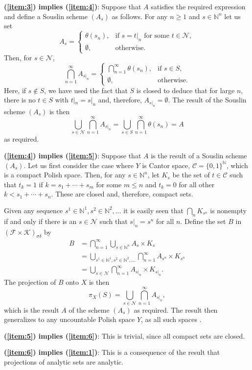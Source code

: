 \documentclass[12pt]{article}
\begin{document}
\noindent\textbf{(\ref{item:3}) implies (\ref{item:4})}:
Suppose that $A$ satisfies the required expression and define a Souslin scheme $(A_s)$ as follows. For any $n\ge 1$ and $s\in\mathbb{N}^n$ let us set
\begin{equation*}
A_s=\begin{cases}
\theta(s_n),&\textrm{if $s=t|_n$ for some $t\in \mathcal{N}$},\\
\emptyset,&\textrm{otherwise}.
\end{cases}
\end{equation*}
Then, for $s\in\mathcal{N}$,
\begin{equation*}
\bigcap_{n=1}^\infty A_{s|_n}=\begin{cases}
\bigcap_{n=1}^\infty\theta(s_n),&\textrm{if $s\in S$},\\
\emptyset,&\textrm{otherwise}.
\end{cases}
\end{equation*}
Here, if $s\not\in S$, we have used the fact that $S$ is closed to deduce that for large $n$, there is no $t\in S$ with $t|_n=s|_n$ and, therefore, $A_{s|_n}=\emptyset$.
The result of the Souslin scheme $(A_s)$ is then
\begin{equation*}
\bigcup_{s\in\mathcal{N}}\bigcap_{n=1}^\infty A_{s|_n}=\bigcup_{s\in S}\bigcap_{n=1}^\infty\theta(s_n) = A
\end{equation*}
as required.

\noindent\textbf{(\ref{item:4}) implies (\ref{item:5})}:
Suppose that $A$ is the result of a Souslin scheme $(A_s)$. Let us first consider the case where $Y$ is Cantor space, $\mathcal{C}=\{0,1\}^\mathbb{N}$, which is a compact Polish space.
Then, for any $s\in\mathbb{N}^n$, let $K_s$ be the set of $t\in\mathcal{C}$ such that $t_k=1$ if $k=s_1+\cdots+s_m$ for some $m\le n$ and $t_k=0$ for all other $k< s_1+\cdots+s_n$.
These are closed and, therefore, compact sets.

Given any sequence $s^1\in\mathbb{N}^1,s^2\in\mathbb{N}^2,\ldots$ it is easily seen that $\bigcap_nK_{s^n}$ is nonempty if and only if there is an $s\in\mathcal{N}$ such that $s|_n=s^n$ for all $n$.
Define the set $B$ in $(\mathcal{F}\times\mathcal{K})_{\sigma\delta}$ by
\begin{equation*}\begin{split}
B&=\bigcap_{n=1}^\infty\bigcup_{s\in\mathbb{N}^n}A_s\times K_s\\
&=\bigcup_{s^1\in\mathbb{N}^1,s^2\in\mathbb{N}^2,\ldots}\bigcap_{n=1}^\infty A_{s^n}\times K_{s^n}\\
&=\bigcup_{s\in\mathcal{N}}\bigcap_{n=1}^\infty A_{s|_n}\times K_{s|_n}.
\end{split}\end{equation*}
The projection of $B$ onto $X$ is then
\begin{equation*}
\pi_X(S)=\bigcup_{s\in\mathcal{N}}\bigcap_{n=1}^\infty A_{s|_n},
\end{equation*}
which is the result $A$ of the scheme $(A_s)$ as required.
The result then generalizes to any uncountable Polish space $Y$, as all such spaces .

\noindent\textbf{(\ref{item:5}) implies (\ref{item:6})}:
This is trivial, since all compact sets are closed.

\noindent\textbf{(\ref{item:6}) implies (\ref{item:1})}:
This is a consequence of the result that projections of analytic sets are analytic.

\end{document}
